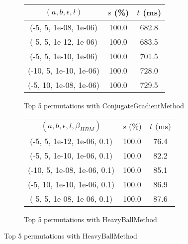 \begin{figure}[H]
\begin{subfigure}[ht]{.5\textwidth}
\begin{tabular}{|c|c|c|}
\hline
\rowcolor{gray!25}
$(a,b,\epsilon,l)$ & $s$ (\%) & $t$ (ms) \\
\hline
(-5, 5, 1e-08, 1e-06) & 100.0 & 682.8 \\
(-5, 5, 1e-12, 1e-06) & 100.0 & 683.5 \\
(-5, 5, 1e-10, 1e-06) & 100.0 & 701.5 \\
(-10, 5, 1e-10, 1e-06) & 100.0 & 728.0 \\
(-5, 10, 1e-08, 1e-06) & 100.0 & 729.5 \\
\hline
\end{tabular}
\caption{Top 5 permutations with ConjugateGradientMethod}
\label{subfig:param_comp_NegativeEntropy_ConjugateGradientMethod_FibonacciSearch}
\end{subfigure}
\hfill
\begin{subfigure}[ht]{.5\textwidth}
\begin{tabular}{|c|c|c|}
\hline
\rowcolor{gray!25}
\multicolumn{3}{|c|}{HeavyBallMethod} \\
\hline
\rowcolor{gray!25}
$(a,b,\epsilon,l,\beta_{HBM})$ & $s$ (\%) & $t$ (ms) \\
\hline
(-5, 5, 1e-12, 1e-06, 0.1) & 100.0 & 76.4 \\
(-5, 5, 1e-10, 1e-06, 0.1) & 100.0 & 82.2 \\
(-10, 5, 1e-08, 1e-06, 0.1) & 100.0 & 85.1 \\
(-5, 10, 1e-10, 1e-06, 0.1) & 100.0 & 86.9 \\
(-5, 5, 1e-08, 1e-06, 0.1) & 100.0 & 87.6 \\
\hline
\end{tabular}
\caption{Top 5 permutations with HeavyBallMethod}
\label{subfig:param_comp_NegativeEntropy_HeavyBallMethod_FibonacciSearch}
\end{subfigure}
\end{figure}